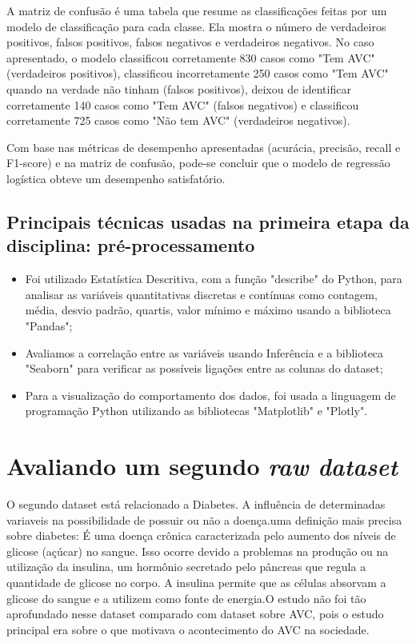 \documentclass[conference]{IEEEtran}
\begin{document}
A matriz de confusão é uma tabela que resume as classificações feitas por um modelo de classificação para cada classe. Ela mostra o número de verdadeiros positivos, falsos positivos, falsos negativos e verdadeiros negativos. No caso apresentado, o modelo classificou corretamente 830 casos como "Tem AVC" (verdadeiros positivos), classificou incorretamente 250 casos como "Tem AVC" quando na verdade não tinham (falsos positivos), deixou de identificar corretamente 140 casos como "Tem AVC" (falsos negativos) e classificou corretamente 725 casos como "Não tem AVC" (verdadeiros negativos).

Com base nas métricas de desempenho apresentadas (acurácia, precisão, recall e F1-score) e na matriz de confusão, pode-se concluir que o modelo de regressão logística obteve um desempenho satisfatório. \\


\subsection{Principais técnicas usadas na primeira etapa da disciplina: pré-processamento}

\begin{itemize}
\item Foi utilizado Estatística Descritiva, com a função "describe" do Python, para analisar as variáveis quantitativas discretas e contínuas como contagem, média, desvio padrão, quartis, valor mínimo e máximo usando a biblioteca "Pandas";
\item Avaliamos a correlação entre as variáveis usando Inferência e a biblioteca "Seaborn" para verificar as possíveis ligações entre as colunas do dataset;
\item Para a visualização do comportamento dos dados, foi usada a linguagem de programação Python utilizando as bibliotecas "Matplotlib" e "Plotly".
\end{itemize}



\section{Avaliando um segundo \textit{raw dataset}}
 
O segundo dataset está relacionado a Diabetes. A influência de determinadas variaveis na possibilidade de possuir ou não a doença.uma definição mais precisa sobre diabetes: É uma doença crônica caracterizada pelo aumento dos níveis de glicose (açúcar) no sangue. Isso ocorre devido a problemas na produção ou na utilização da insulina, um hormônio secretado pelo pâncreas que regula a quantidade de glicose no corpo. A insulina permite que as células absorvam a glicose do sangue e a utilizem como fonte de energia.O estudo não foi tão aprofundado nesse dataset comparado com dataset sobre AVC, pois o estudo principal era sobre o que motivava o acontecimento do AVC na sociedade.
\end{document}
